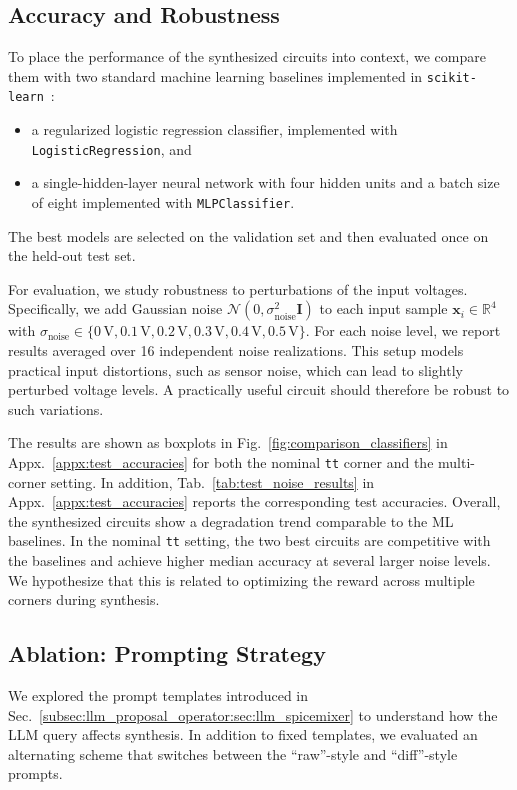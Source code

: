 \documentclass[sigconf,pbalance]{acmart_modified}
\newcommand{\squeezeSubSection}{}
\begin{document}
\squeezeSubSection\subsection{Accuracy and Robustness}
To place the performance of the synthesized circuits into context, we compare them with two standard machine learning baselines implemented in \texttt{scikit-learn}~\cite{pedregosa2011scikit}:
\begin{itemize}[noitemsep, topsep=0pt, leftmargin=*]
    \item a regularized logistic regression classifier, implemented with \texttt{LogisticRegression}, and
    \item a single-hidden-layer neural network with four hidden units and a batch size of eight implemented with \texttt{MLPClassifier}.
\end{itemize}
The best models are selected on the validation set and then evaluated once on the held-out test set.

For evaluation, we study robustness to perturbations of the input voltages. Specifically, we add Gaussian noise
$\mathcal{N}(0, \sigma_\text{noise}^2 \mathbf{I})$
to each input sample $\mathbf{x}_i \in \mathbb{R}^4$ with
$\sigma_\text{noise} \in \{0\,\text{V}, 0.1\,\text{V}, 0.2\,\text{V}, 0.3\,\text{V}, 0.4\,\text{V}, 0.5\,\text{V}\}$.
For each noise level, we report results averaged over 16 independent noise realizations. This setup models practical input distortions, such as sensor noise, which can lead to slightly perturbed voltage levels. A practically useful circuit should therefore be robust to such variations.

The results are shown as boxplots in Fig.~\ref{fig:comparison_classifiers} in Appx.~\ref{appx:test_accuracies} for both the nominal \texttt{tt} corner and the multi-corner setting. In addition, Tab.~\ref{tab:test_noise_results} in Appx.~\ref{appx:test_accuracies} reports the corresponding test accuracies. Overall, the synthesized circuits show a degradation trend comparable to the ML baselines. In the nominal \texttt{tt} setting, the two best circuits are competitive with the baselines and achieve higher median accuracy at several larger noise levels. We hypothesize that this is related to optimizing the reward across multiple corners during synthesis.



\squeezeSubSection\subsection{Ablation: Prompting Strategy}
\label{subsec:prompt:sec:results}
We explored the prompt templates introduced in Sec.~\ref{subsec:llm_proposal_operator:sec:llm_spicemixer} to understand how the LLM query affects synthesis. In addition to fixed templates, we evaluated an alternating scheme that switches between the ``raw''-style and ``diff''-style prompts.
\end{document}
